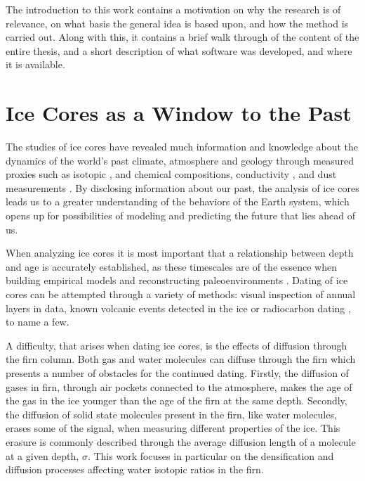 \documentclass[../../CompleteThesis2/Complete_2ndDraft]{subfiles}
\begin{document}
The introduction to this work contains a motivation on why the research is of relevance, on what basis the general idea is based upon, and how the method is carried out. Along with this, it contains a brief walk through of the content of the entire thesis, and a short description of what software was developed, and where it is available.
\minitoc	

\section[Ice Cores]{Ice Cores as a Window to the Past}
\label{Sec:StudyIceCores}

The studies of ice cores have revealed much information and knowledge about the dynamics of the world's past climate, atmosphere and geology through measured proxies such as isotopic \cite[W. Dansgaard, 1964]{Dansgaard1964}, \cite[S. Johnsen et al., 2001]{Johnsen2001} and chemical compositions, conductivity \cite[Moore et al., 1990]{Moore1990}, and dust measurements \cite[F. Lambert et al., 2008]{Lambert2008}. By disclosing information about our past, the analysis of ice cores leads us to a greater understanding of the behaviors of the Earth system, which opens up for possibilities of modeling and predicting the future that lies ahead of us.
	
When analyzing ice cores it is most important that a relationship between depth and age is accurately established, as these timescales are of the essence when building empirical models and reconstructing paleoenvironments \cite[E. Capron, 2013]{Capron2013}. Dating of ice cores can be attempted through a variety of methods: visual inspection of annual layers in data, known volcanic events detected in the ice \cite[B. M. Vinther et al., 2006]{Vinther2006} or radiocarbon dating \cite[S. Aciego et al., 2011]{Aciego2011}, to name a few. 
	
A difficulty, that arises when dating ice cores, is the effects of diffusion through the firn column. Both gas and water molecules can diffuse through the firn which presents a number of obstacles for the continued dating. Firstly, the diffusion of gases in firn, through air pockets connected to the atmosphere, makes the age of the gas in the ice younger than the age of the firn at the same depth. Secondly, the diffusion of solid state molecules present in the firn, like water molecules, erases some of the signal, when measuring different properties of the ice. This erasure is commonly described through the average diffusion length of a molecule at a given depth, $\sigma$. This work focuses in particular on the densification and diffusion processes affecting water isotopic ratios in the firn.
	
\end{document}
